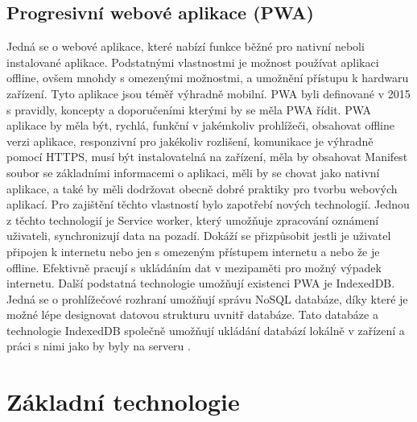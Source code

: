         \subsection{Progresivní webové aplikace (PWA)}
Jedná se o webové aplikace, které nabízí funkce běžné pro nativní neboli instalované aplikace. Podstatnými vlastnostmi je možnost používat aplikaci offline, ovšem mnohdy s omezenými možnostmi, a umožnění přístupu k hardwaru zařízení. Tyto aplikace jsou téměř výhradně mobilní. PWA byli definované v 2015 s pravidly, koncepty a doporučeními kterými by se měla PWA řídit. PWA aplikace by měla být, rychlá, funkční v jakémkoliv prohlížeči, obsahovat offline verzi aplikace, responzivní pro jakékoliv rozlišení, komunikace je výhradně pomocí HTTPS, musí být instalovatelná na zařízení, měla by obsahovat Manifest soubor se základními informacemi o aplikaci, měli by se chovat jako nativní aplikace, a také by měli dodržovat obecně dobré praktiky pro tvorbu webových aplikací. Pro zajištění těchto vlastností bylo zapotřebí nových technologií. Jednou z těchto technologií je Service worker, který umožňuje zpracování oznámení uživateli, synchronizují data na pozadí. Dokáží se přizpůsobit jestli je uživatel připojen k internetu nebo jen s omezeným přístupem internetu a nebo že je offline. Efektivně pracují s ukládáním dat v mezipaměti pro možný výpadek internetu. Další podstatná technologie umožňují existenci PWA je IndexedDB. Jedná se o prohlížečové rozhraní umožňují správu NoSQL databáze, díky které je možné lépe designovat datovou strukturu uvnitř databáze. Tato databáze a technologie IndexedDB společně umožňují ukládání databází lokálně v zařízení a práci s nimi jako by byly na serveru \cite{pwas}.

    \section{Základní technologie}
